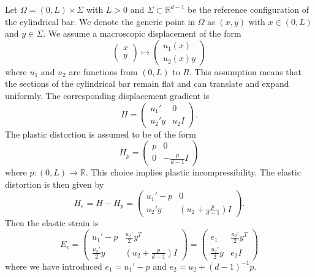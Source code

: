 \documentclass[a4paper,10pt,oneside]{amsbook}
\numberwithin{section}{chapter}
\numberwithin{equation}{chapter}
\theoremstyle{definition}
\begin{document}
Let $\Omega=(0,L)\times\Sigma$ with $L>0$ and $\Sigma\subset\mathbb{R}^{d-1}$ be the reference configuration of the cylindrical bar. We denote the generic point in $\Omega$ as $(x,y)$ with $x\in(0,L)$ and $y\in\Sigma$. We assume a macroscopic displacement of the form
\begin{equation}
\label{eqn:displacement}
\begin{pmatrix}
x \\
y
\end{pmatrix}
\mapsto
\begin{pmatrix}
u_1(x) \\
u_2(x)y
\end{pmatrix}
\end{equation}
where $u_1$ and $u_2$ are functions from $(0,L)$ to ${R}$. This assumption means that the sections of the cylindrical bar remain flat and can translate and expand uniformly. The corresponding displacement gradient is
\[
H=\begin{pmatrix}
u_1' & 0 \\
u_2'y & u_2I
\end{pmatrix}.
\]
The plastic distortion is assumed to be of the form
\begin{equation}
\label{eqn:plastic}
H_p=
\begin{pmatrix}
p & 0 \\
0 & -\frac{p}{d-1}I
\end{pmatrix}
\end{equation}
where $p\colon(0,L)\to\mathbb{R}$. This choice implies plastic incompressibility. The elastic distortion is then given by
\[
H_e=H-H_p=\begin{pmatrix}
u_1'-p & 0 \\
u_2'y & \left(u_2+\frac{p}{d-1}\right)I
\end{pmatrix}.
\]
Then the elastic strain is
\[
E_e=\begin{pmatrix}
u_1'-p & \frac{u_2'}{2}y^T \\
\frac{u_2'}{2}y & \left(u_2+\frac{p}{d-1}\right)I
\end{pmatrix}=
\begin{pmatrix}
e_1 & \frac{u_2'}{2}y^T \\
\frac{u_2'}{2}y & e_2I
\end{pmatrix}
\]
where we have introduced $e_1=u_1'-p$ and $e_2=u_2+(d-1)^{-1}p$.
\end{document}
